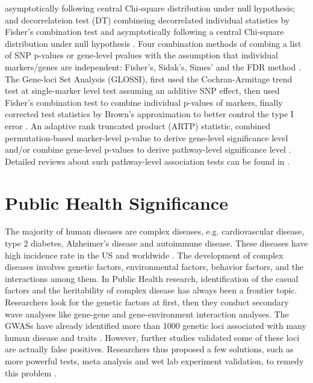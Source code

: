 \documentclass[12pt]{article}
\begin{document}
asymptotically following central Chi-square distribution under null hypothesis; and decorrelateion test (DT) combineing decorrelated individual statistics by Fisher's combination test and asymptotically following a central Chi-square distribution under null hypothesis \cite{Luo2010}. Four combination methods of combing a list of SNP p-values or gene-level pvalues with the assumption that individual markers/genes are independent: Fisher's, Sidak's, Simes' and the FDR method \cite{peng2009gene}. The Gene-loci Set Analysis (GLOSSI), first used the Cochran-Armitage trend test at single-marker level test assuming an additive SNP effect, then used Fisher's combination test to combine individual p-values of markers, finally corrected test statistics by Brown's approximation to better control the type I error \cite{Chai2009}. An adaptive rank truncated product (ARTP) statistic, combined permutation-based marker-level p-value to derive gene-level significance level and/or combine gene-level p-values to derive pathway-level significance level \cite{Yu2009}. Detailed reviews about such pathway-level association tests can be found in \cite{tintle2011inflated,Wang2010,Fridley2011}. 

\section{Public Health Significance}\label{sec:PHsig}
The majority of human diseases are complex diseases, e.g. cardiovascular disease, type 2 diabetes, Alzheimer's disease and autoimmune disease. These diseases have high incidence rate in the US and worldwide \cite{Craig2008,Cardon2001,Hirschhorn2005}. The development of complex diseases involves genetic factors, environmental factors, behavior factors, and the interactions among them. In Public Health research, identification of the casual factors and the heritability of complex disease has always been a frontier topic. Researchers look for the genetic factors at first, then they conduct secondary wave analyses like gene-gene and gene-environment interaction analyses.  The GWASs have already identified more than 1000 genetic loci associated with many human disease and traits \cite{Hindorff2009}. However, further studies validated some of these loci are actually false positives. Researchers thus proposed a few solutions, such as more powerful tests, meta analysis and wet lab experiment validation, to remedy this problem \cite{Wang2005,Hirschhorn2005,McCarthy2008,Hindorff2009,Cantor2010}. 
\end{document}
